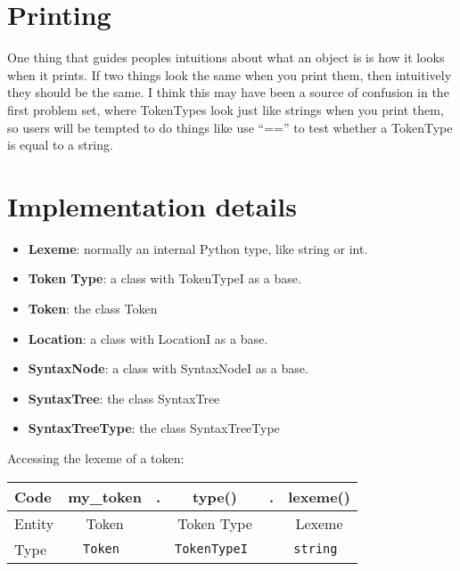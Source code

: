 \documentclass{article}
\begin{document}
\section{Printing}

One thing that guides peoples intuitions about what an object is is
how it looks when it prints.  If two things look the same when you
print them, then intuitively they should be the same.  I think this
may have been a source of confusion in the first problem set, where
TokenTypes look just like strings when you print them, so users will
be tempted to do things like use ``=='' to test whether a TokenType
is equal to a string.

\newpage
\section{Implementation details}

\begin{itemize}
  \item \textbf{Lexeme}: normally an internal Python type, like string
  or int.

  \item \textbf{Token Type}: a class with TokenTypeI as a base.

  \item \textbf{Token}: the class Token

  \item \textbf{Location}: a class with LocationI as a base.

  \item \textbf{SyntaxNode}: a class with SyntaxNodeI as a base.

  \item \textbf{SyntaxTree}: the class SyntaxTree

  \item \textbf{SyntaxTreeType}: the class SyntaxTreeType

\end{itemize}

\noindent
Accessing the lexeme of a token:\\
\begin{tabular}{|l|ccccc|}
\hline
Code    &my\_token&. & type()&. & lexeme() \\
\hline
Entity  &Token && Token Type && Lexeme \\
Type    &\tt Token && \tt TokenTypeI && \tt string \\
\hline
\end{tabular}
\end{document}
